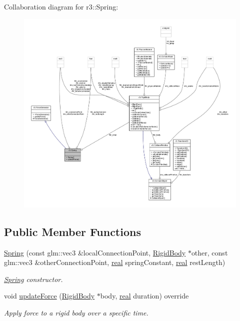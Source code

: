 Collaboration diagram for r3\+:\+:Spring\+:\nopagebreak
\begin{figure}[H]
\begin{center}
\leavevmode
\includegraphics[width=350pt]{classr3_1_1_spring__coll__graph}
\end{center}
\end{figure}
\subsection*{Public Member Functions}
\begin{DoxyCompactItemize}
\item 
\mbox{\hyperlink{classr3_1_1_spring_ae96ec521b5609d2ace1476aec3c831f3}{Spring}} (const glm\+::vec3 \&local\+Connection\+Point, \mbox{\hyperlink{classr3_1_1_rigid_body}{Rigid\+Body}} $\ast$other, const glm\+::vec3 \&other\+Connection\+Point, \mbox{\hyperlink{namespacer3_ab2016b3e3f743fb735afce242f0dc1eb}{real}} spring\+Constant, \mbox{\hyperlink{namespacer3_ab2016b3e3f743fb735afce242f0dc1eb}{real}} rest\+Length)
\begin{DoxyCompactList}\small\item\em \mbox{\hyperlink{classr3_1_1_spring}{Spring}} constructor. \end{DoxyCompactList}\item 
void \mbox{\hyperlink{classr3_1_1_spring_a3305adfd568606ed9ae6fb589f20446b}{update\+Force}} (\mbox{\hyperlink{classr3_1_1_rigid_body}{Rigid\+Body}} $\ast$body, \mbox{\hyperlink{namespacer3_ab2016b3e3f743fb735afce242f0dc1eb}{real}} duration) override
\begin{DoxyCompactList}\small\item\em Apply force to a rigid body over a specific time. \end{DoxyCompactList}\end{DoxyCompactItemize}
